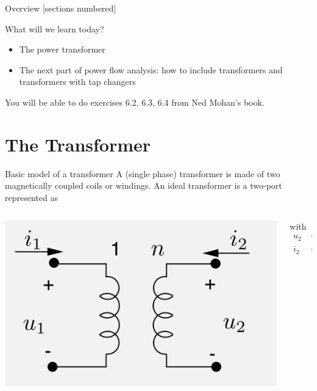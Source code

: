 \titleframe

\begin{frame}[allowframebreaks]{Overview}
  [sections numbered]
  \tableofcontents%
\end{frame}


\begin{frame}{What will we learn today?}
    \begin{itemize}
        \item The power transformer
        \item The next part of power flow analysis: how to include transformers and transformers with tap changers
    \end{itemize}
    You will be able to do exercises 6.2, 6.3, 6.4 from Ned Mohan's book.
\end{frame}



\section{The Transformer}
\begin{frame}{Basic model of a transformer}
A (single phase) transformer is made of two magnetically coupled \alert{coils} or \alert{windings}.
An ideal transformer is a two-port represented as 
\begin{columns}
    \begin{column}{0.45\textwidth}
        \includegraphics[width=\textwidth]{images/ideal_transformer.png}
    \end{column}
    \begin{column}{0.35\textwidth}
        with
        \begin{align*}
        u_2  &= n u_1 \\
        i_2  &= -\frac{1}{n}i_1
        \end{align*}
    \end{column}
\end{columns}
\end{frame}

